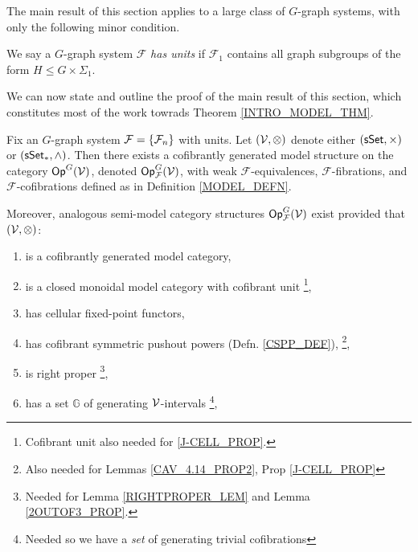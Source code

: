 \documentclass[a4paper,10pt
,draft
]{article}%
\renewcommand{\F}{\mathcal F}
\renewcommand{\1}{\eta}%
\begin{document}
The main result of this section applies to a large class of $G$-graph systems, with only the following minor condition.

\begin{definition}
      We say a $G$-graph system $\F$ \textit{has units} if
      $\F_1$ contains all graph subgroups of the form $H \leq G \times \Sigma_1$.
\end{definition}

We can now state and outline the proof of the main result of this section,
which constitutes most of the work towrads Theorem \ref{INTRO_MODEL_THM}. %

\begin{theorem}
      \label{MODEL_THM}
      Fix an $G$-graph system $\F = \set{\F_n}$ with units.
      Let $(\mathcal V, \otimes)$ denote either $(\mathsf{sSet}, \times)$ or $(\sSet_{\**}, \wedge)$.
      Then there exists a cofibrantly generated model structure on the category $\mathsf{Op}^G(\mathcal V)$,
      denoted $\Op^G_\F(\V)$, with
      weak $\F$-equivalences, $\F$-fibrations, and $\F$-cofibrations defined as in Definition \ref{MODEL_DEFN}.
           
      Moreover, analogous semi-model category structures $\Op^G_\F(\V)$ exist
      provided that $(\mathcal V, \otimes)$:
      \begin{enumerate}[label = (\roman*)]\itemsep-4pt
      \item is a cofibrantly generated model category,
      \item is a closed monoidal model category with cofibrant unit
            \footnote{Cofibrant unit also needed for \ref{J-CELL_PROP}.},
      \item has cellular fixed-point functors,
      \item \label{CSPP_LBL} has cofibrant symmetric pushout powers (Defn. \ref{CSPP_DEF}),
            \footnote{Also needed for Lemmas \ref{CAV_4.14_PROP2}, Prop \ref{J-CELL_PROP}}, %
      \item \label{RP_LBL} is right proper
            \footnote{Needed for Lemma \ref{RIGHTPROPER_LEM} and Lemma \ref{2OUTOF3_PROP}.},
      \item \label{GENSET_LBL} has a set $\mathbb{G}$ of generating $\mathcal V$-intervals
            \footnote{Needed so we have a \textit{set} of generating trivial cofibrations},
      \end{enumerate}
\end{theorem}
\end{document}
